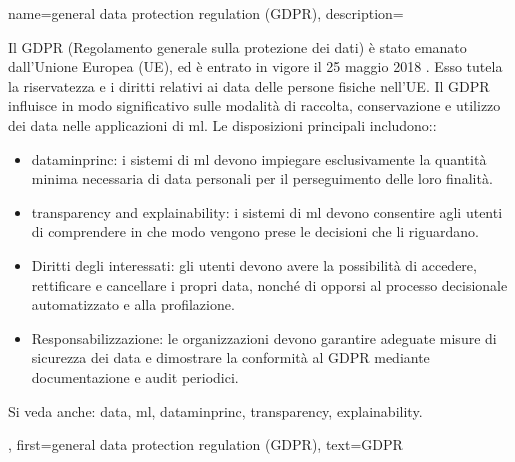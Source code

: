 {name={general data protection regulation (GDPR)},
	description={Il GDPR (Regolamento generale sulla protezione dei dati)
			è stato emanato dall’Unione Europea (UE), ed è entrato in vigore il 25 maggio 2018 \cite{GDPR2016}. 
			Esso tutela la riservatezza e i diritti relativi ai \gls{data} delle persone fisiche nell’UE. Il GDPR influisce in 
			modo significativo sulle modalità di raccolta, conservazione e utilizzo dei \gls{data} nelle applicazioni di \gls{ml}.  
			Le disposizioni principali includono::
			\begin{itemize}
				\item \Gls{dataminprinc}: i sistemi di \gls{ml} devono impiegare esclusivamente la quantità minima necessaria di \gls{data} personali 
				per il perseguimento delle loro finalità. 
				\item \Gls{transparency} and \gls{explainability}: i sistemi di \gls{ml} devono consentire agli utenti 
				di comprendere in che modo vengono prese le decisioni che li riguardano.				
				\item Diritti degli interessati: gli utenti devono avere la possibilità di accedere, 
				rettificare e cancellare i propri \gls{data}, nonché di opporsi al processo decisionale automatizzato e alla profilazione.
				\item Responsabilizzazione: le organizzazioni devono garantire adeguate misure di sicurezza dei \gls{data} 
				e dimostrare la conformità al GDPR mediante documentazione e audit periodici.
			\end{itemize}
		Si veda anche: \gls{data}, \gls{ml}, \gls{dataminprinc}, \gls{transparency}, \gls{explainability}.}, 
	first={general data protection regulation (GDPR)},
	text={GDPR}
}
	
